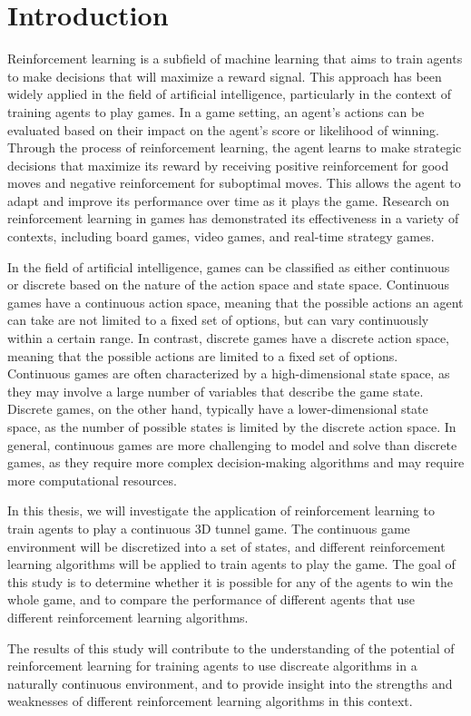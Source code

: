 \chapter*{Introduction}

Reinforcement learning is a subfield of machine learning that aims to train agents to make decisions that will maximize a reward signal. This approach has been widely applied in the field of artificial intelligence, particularly in the context of training agents to play games. In a game setting, an agent's actions can be evaluated based on their impact on the agent's score or likelihood of winning. Through the process of reinforcement learning, the agent learns to make strategic decisions that maximize its reward by receiving positive reinforcement for good moves and negative reinforcement for suboptimal moves. This allows the agent to adapt and improve its performance over time as it plays the game. Research on reinforcement learning in games has demonstrated its effectiveness in a variety of contexts, including board games, video games, and real-time strategy games.

In the field of artificial intelligence, games can be classified as either continuous or discrete based on the nature of the action space and state space. Continuous games have a continuous action space, meaning that the possible actions an agent can take are not limited to a fixed set of options, but can vary continuously within a certain range. In contrast, discrete games have a discrete action space, meaning that the possible actions are limited to a fixed set of options.
Continuous games are often characterized by a high-dimensional state space, as they may involve a large number of variables that describe the game state. Discrete games, on the other hand, typically have a lower-dimensional state space, as the number of possible states is limited by the discrete action space.
In general, continuous games are more challenging to model and solve than discrete games, as they require more complex decision-making algorithms and may require more computational resources.

In this thesis, we will investigate the application of reinforcement learning to train agents to play a continuous 3D tunnel game. The continuous game environment will be discretized into a set of states, and different reinforcement learning algorithms will be applied to train agents to play the game. The goal of this study is to determine whether it is possible for any of the agents to win the whole game, and to compare the performance of different agents that use different reinforcement learning algorithms.

The results of this study will contribute to the understanding of the potential of reinforcement learning for training agents to use discreate algorithms in a naturally continuous environment, and to provide insight into the strengths and weaknesses of different reinforcement learning algorithms in this context.